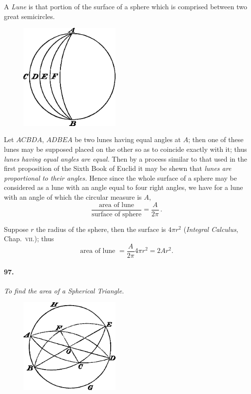 \documentclass{book}[2004/02/16]
\begin{document}
\begin{mainmatter}
\begin{spacing}{1.3}
A \textit{Lune} is that portion of the surface of a sphere which is
comprised between two great semicircles.
\begin{figure}[htp]
\centering
\includegraphics[width=5.0cm]{images/077fc}
\end{figure}

Let $ACBDA$, $ADBEA$ be two lunes having equal angles at $A$;
then one of these lunes may be supposed placed on the other so as
to coincide exactly with it; thus \textit{lunes having equal angles are
equal.} Then by a process similar to that used in the first proposition
of the Sixth Book of Euclid it may be shewn that \textit{lunes
are proportional to their angles.} Hence since the whole surface of
a sphere may be considered as a lune with an angle equal to four
right angles, we have for a lune with an angle of which the
circular measure is $A$,
\[
  \dfrac{\text{area of lune}}{\text{surface of sphere}}
= \dfrac{A}{2\pi}\,.
\]

Suppose $r$ the radius of the sphere, then the surface is $4\pi r^2$
(\textit{Integral Calculus}, Chap.~\textsc{vii.}); thus
\[
  \text{area of lune } = \dfrac{A}{2\pi} 4\pi r^2 = 2Ar^2.
\]

\paragraph{97.} \textit{To find the area of a Spherical Triangle.}
\begin{figure}[htp]
\centering
\includegraphics[width=5.0cm]{images/078fc}
\end{figure}


\end{spacing}
\end{mainmatter}
\end{document}
